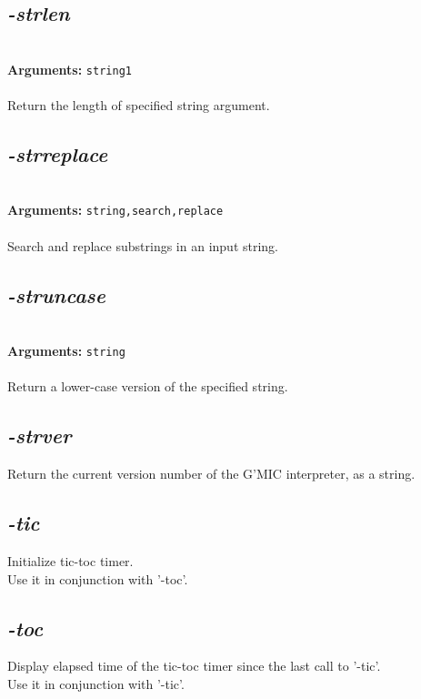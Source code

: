 \documentclass[a4paper,11pt,twoside]{book}
\begin{document}
\subsection{\emph{-strlen} }\vspace*{-0.5em}
~\\\textbf{Arguments: } 
{\small \texttt{string1}}\\~\\
Return the length of specified string argument.


\subsection{\emph{-strreplace} }\vspace*{-0.5em}
~\\\textbf{Arguments: } 
{\small \texttt{string,search,replace}}\\~\\
Search and replace substrings in an input string.


\subsection{\emph{-struncase} }\vspace*{-0.5em}
~\\\textbf{Arguments: } 
{\small \texttt{string}}\\~\\
Return a lower-case version of the specified string.


\subsection{\emph{-strver} }\vspace*{-0.5em}
Return the current version number of the G'MIC interpreter, as a string.


\subsection{\emph{-tic} }\vspace*{-0.5em}
Initialize tic-toc timer.
~\\Use it in conjunction with '-toc'.


\subsection{\emph{-toc} }\vspace*{-0.5em}
Display elapsed time of the tic-toc timer since the last call to '-tic'.
~\\Use it in conjunction with '-tic'.
\end{document}
